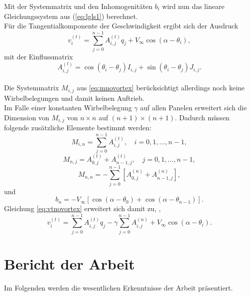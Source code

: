 Mit der Systemmatrix und den Inhomogenitäten $b_i$ wird nun das lineare Gleichungssystem aus (\ref{eq:lgls1}) berechnet. \\
Für die Tangentialkomponente der Geschwindigkeit ergibt sich der Ausdruck
\begin{equation}
\label{eq:vtnovortex}
v_i^{(t)} =  \sum_{j=0}^{n-1} A_{i,j}^{(t)} q_j + V_{\infty} \cos{(\alpha - \theta_i)},
\end{equation}
mit der Einflussmatrix
\begin{equation}
\label{eq:At}
A_{i,j}^{(t)} =  \cos{(\theta _i - \theta _j)} I_{i,j} + \sin{(\theta _i - \theta _j)} J_{i,j}.
\end{equation}
\\
Die Systemmatrix $M_{i,j}$ aus \eqref{eq:mnovortex} berücksichtigt allerdings noch keine Wirbelbelegungen und damit keinen Auftrieb.\\
Im Falle einer konstanten Wirbelbelegung $\gamma$ auf allen Panelen erweitert sich die Dimension von $M_{i,j}$ von $n \times n$ auf $(n+1) \times (n+1)$. Dadurch müssen folgende zusätzliche Elemente bestimmt werden:
\begin{equation}
M_{i,n} =  \sum_{j=0}^{n-1} A_{i,j}^{(t)},  \quad i=0,1,\ldots, n-1,
\end{equation}
\begin{equation}
M_{n,j} =  A_{0,j}^{(t)} + A_{n-1,j}^{(t)},  \quad j =0,1,\ldots, n-1,
\end{equation}
\begin{equation}
M_{n,n} =  - \sum_{j=0}^{n-1} \left[ A_{0,j}^{(n)} + A_{n-1,j}^{(n)}\right],
\end{equation}
und
\begin{equation}
b_n =  -V_{\infty} [\cos{(\alpha -\theta_0)} + \cos{(\alpha -\theta _{n-1})}].
\end{equation}
Gleichung \eqref{eq:vtnovortex} erweitert sich damit zu, \cite{Hess:1966}, \cite{Cebeci:1999}
\begin{equation}
\label{eq:vtvortex}
v_i^{(t)} =  \sum_{j=0}^{n-1} A_{i,j}^{(t)} q_j - \gamma \sum_{j=0}^{n-1}A_{i,j}^{(n)} + V_{\infty} \cos{(\alpha - \theta_i)}.
\end{equation}

\newpage
\chapter{Bericht der Arbeit}
Im Folgenden werden die wesentlichen Erkenntnisse der Arbeit präsentiert.
